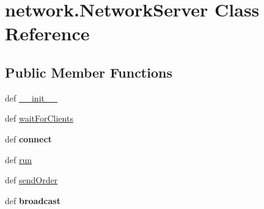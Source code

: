 \hypertarget{classnetwork_1_1_network_server}{\section{network.\-Network\-Server \-Class \-Reference}
\label{classnetwork_1_1_network_server}
}
\subsection*{\-Public \-Member \-Functions}
\begin{DoxyCompactItemize}
\item 
def \hyperlink{classnetwork_1_1_network_server_aa9f159b48e22d2de684f20772d8f0fd2}{\-\_\-\-\_\-init\-\_\-\-\_\-}
\item 
def \hyperlink{classnetwork_1_1_network_server_adf074e54d57e4ecb954cb023b04284df}{wait\-For\-Clients}
\item 
\hypertarget{classnetwork_1_1_network_server_acf6374298f323930652d4913c2a568bd}{def {\bfseries connect}}\label{classnetwork_1_1_network_server_acf6374298f323930652d4913c2a568bd}

\item 
def \hyperlink{classnetwork_1_1_network_server_a05f8e0752edec2aa6e8624d620313bde}{run}
\item 
def \hyperlink{classnetwork_1_1_network_server_ae43e03d3762a8deb704ad3b2d6822172}{send\-Order}
\item 
\hypertarget{classnetwork_1_1_network_server_a7c2389b704ae6a7d52631f2fa6f19772}{def {\bfseries broadcast}}\label{classnetwork_1_1_network_server_a7c2389b704ae6a7d52631f2fa6f19772}

\end{DoxyCompactItemize}

